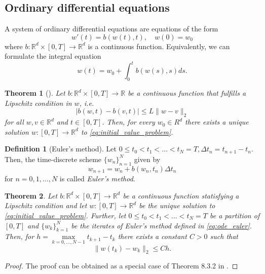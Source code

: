 \documentclass[12pt]{article}
\newtheorem{theorem}{Theorem}[section]
\theoremstyle{definition}
\newtheorem{definition}[definition]{Definition}
\numberwithin{equation}{section}
\newcommand{\R}{\mathbb{R}}
\newcommand{\norm}[1]{\lVert{#1}\rVert_2}
\begin{document}
\subsection{Ordinary differential equations}
A system of ordinary differential equations are equations of the form
\begin{equation}
  \label{eq:initial_value_problem}
  w'(t) = b(w(t),t), \quad w(0) = w_0
\end{equation}
where $b : \R^d \times [0,T] \rightarrow \R^d$ is a continuous function. Equivalently, we can formulate the integral equation
\begin{equation}
  w(t) = w_0 + \int_0^t b(w(s),s)ds.
\end{equation}
\begin{theorem}[]
  Let $b : \R^d \times [0,T] \rightarrow \R$ be a continuous function that fulfills a Lipschitz condition in $w$, i.e.
  \begin{equation*}
    \lvert b(w,t) - b(v,t) \rvert \leq L \norm{w - v}
  \end{equation*}
  for all $w,v \in \R^d$ and $t \in [0,T]$. Then, for every $w_0 \in R^d$ there exists a unique solution $w:[0,T] \rightarrow \R^d$ to \eqref{eq:initial_value_problem}.
\end{theorem}
\begin{definition}[Euler's method]
  Let $0 \leq t_0 < t_1 < \dots < t_N = T, \Delta t_n = t_{n+1} - t_n$. Then, the time-discrete scheme $\{w_n\}_{n=1}^N$ given by
  \begin{equation}
    \label{eq:ode_euler}
    w_{n+1} = w_n + b(w_n, t_n) \Delta t_n
  \end{equation}
  for $n=0,1,\dots,N$ is called \emph{Euler's method}.
\end{definition}
\begin{theorem}
  \label{thm:euler_convergence}
  Let $b : \R^d \times [0,T] \rightarrow \R^d$ be a continuous function statisfying a Lipschitz condition and let $w:[0,T] \rightarrow \R^d$ be the unique solution to \eqref{eq:initial_value_problem}. Further, let $0 \leq t_0 < t_1 < \dots < t_N = T$ be a partition of $[0,T]$ and $\{w_k\}_{k=1}^N$ be the iterates of Euler's method defined in \eqref{eq:ode_euler}. Then, for $h = \max\limits_{k=0,\dots,N-1} t_{k+1} - t_k$ there exists a constant $C > 0$ such that
  \begin{equation*}
    \norm{w(t_k) - w_k} \leq C h.
  \end{equation*}
\end{theorem}
\begin{proof}
  The proof can be obtained as a special case of Theorem 8.3.2 in \cite[pp.~294]{kloedenNumericalSolutionStochastic2013}.
\end{proof}
\end{document}

